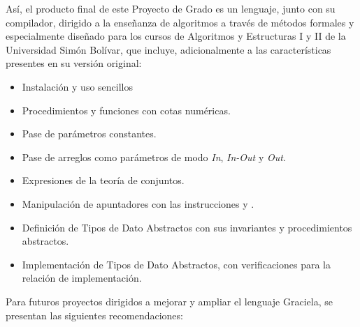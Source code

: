 Así, el producto final de este Proyecto de Grado es un lenguaje, junto con su
compilador, dirigido a la enseñanza de algoritmos a través de métodos formales y
especialmente diseñado para los cursos de Algoritmos y Estructuras I y II de la
Universidad Simón Bolívar, que incluye, adicionalmente a las características
presentes en su versión original:

\begin{itemize}
  \item Instalación y uso sencillos
  \item Procedimientos y funciones con cotas numéricas.
  \item Pase de parámetros constantes.
  \item Pase de arreglos como parámetros de modo \textit{In}, \textit{In-Out} y \textit{Out}.
  \item Expresiones de la teoría de conjuntos.
  \item Manipulación de apuntadores con las instrucciones  y .
  \item Definición de Tipos de Dato Abstractos con sus invariantes y procedimientos abstractos.
  \item Implementación de Tipos de Dato Abstractos, con verificaciones para la relación de implementación.
\end{itemize}

Para futuros proyectos dirigidos a mejorar y ampliar el lenguaje Graciela, se
presentan las siguientes recomendaciones:

